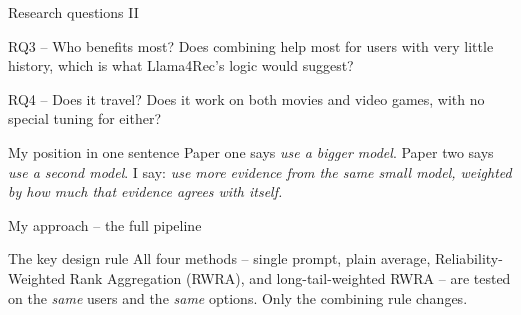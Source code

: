 \documentclass[aspectratio=169,12pt]{beamer}
\begin{document}
\begin{frame}{Research questions II}
\begin{block}{RQ3 -- Who benefits most?}
Does combining help most for users with very little history, which is what
Llama4Rec's logic would suggest?
\end{block}

\vspace{0.5em}
\begin{block}{RQ4 -- Does it travel?}
Does it work on both movies and video games, with no special tuning for
either?
\end{block}

\vspace{0.6em}
\begin{exampleblock}{My position in one sentence}
Paper one says \emph{use a bigger model}. Paper two says \emph{use a second
model}. I say: \emph{use more evidence from the same small model, weighted
by how much that evidence agrees with itself.}
\end{exampleblock}
\end{frame}

\begin{frame}{My approach -- the full pipeline}
\centering
{}

\vspace{0.6em}
\begin{block}{The key design rule}
All four methods -- single prompt, plain average, Reliability-Weighted Rank
Aggregation (RWRA), and long-tail-weighted RWRA -- are tested on the
\emph{same} users and the \emph{same} options. Only the combining rule
changes.
\end{block}
\end{frame}
\end{document}
